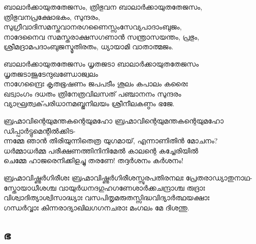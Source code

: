 \begin{enumerate}

\begin{slokam}{\VSv}{\Unk}{ബാലാർക്കായുതതേജസം, ത്രിഭുവന}
ബാലാർക്കായുതതേജസം, ത്രിഭുവനപ്രക്ഷോഭകം, സുന്ദരം,\\
സുഗ്രീവാദിസമസ്തവാനരഗണൈസ്സംസേവ്യപാദാംബുജം,\\
നാദേനൈവ സമസ്തരാക്ഷസഗണാൻ സന്ത്രാസയന്തം, പ്രഭും,\\
ശ്രീമദ്രാമപദാംബുജസ്മൃതിരതം, ധ്യായാമി വാതാത്മജം.
\end{slokam}


\begin{slokam}{\VSv}{\Unk}{ബാലാർക്കായുതതേജസം ധൃതജടാ}
ബാലാർക്കായുതതേജസം ധൃതജടാജൂടേന്ദുഖണ്ഡോജ്വലം\\
നാഗേന്ദ്രൈഃ കൃതഭൂഷണം ജപപടീം ശൂലം കപാലം കരൈഃ\\
ഖട്വാംഗം ദധതം ത്രിനേത്രവിലസത്‌ പഞ്ചാനനം സുന്ദരം\\
വ്യാഘ്രത്വക്‌പരിധാനമബ്ജനിലയം ശ്രീനീലകണ്ഠം ഭജേ.
\end{slokam}


\begin{slokam}{\VSv}{\ONN}{ബ്രഹ്മാവിന്റെയുമന്തകന്റെയുമഹോ}
 ബ്രഹ്മാവിന്റെയുമന്തകന്റെയുമഹോ ഡിപ്പാർട്ടുമെന്റിൽക്കിട-\\
ന്നമ്മേ ഞാൻ തിരിയുന്നിതെത്ര യുഗമായ്‌, എന്നാണിതിൻ മോചനം?\\
ധർമ്മാധർമ്മ പരീക്ഷണത്തിനിനിമേൽ കാലന്റെ കച്ചേരിയിൽ\\
ചെമ്മേ ഹാജരെനിക്കിളച്ചു തരണേ! തദ്ദർശനം കർശനം!
\end{slokam}




\begin{slokam}{\VSr}{\Unk}{ബ്രഹ്മാവിഷ്ണുർഗിരീശഃ}
ബ്രഹ്മാവിഷ്ണുർഗിരീശസ്സുരപതിരനലഃ പ്രേതരാഡ്യാതുനാഥ-\\
സ്തോയാധീശശ്ച വായുർധനദഗുഹഗണേശാർക്കചന്ദ്രാശ്ച രുദ്രാഃ\\
വിശ്വാദിത്യാശ്വിസാദ്ധ്യാഃ വസപിതൃമരുതസ്സിദ്ധവിദ്യാർത്ഥയക്ഷാഃ \\ 
ഗന്ധർവ്വാഃ കിന്നരാദ്യാഖിലഗഗനചരാഃ മംഗലം മേ ദിശന്തു.
\end{slokam}


\end{enumerate}

\subsection{ഭ}

